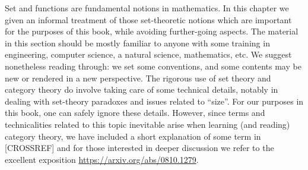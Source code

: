 


Set and functions are fundamental notions in mathematics. In this chapter we given an informal treatment of those set-theoretic notions which are important for the purposes of this book, while avoiding further-going aspects. The material in this section should be mostly familiar to anyone with some training in engineering, computer science, a natural science, mathematics, etc. We suggest nonetheless reading through: we set some conventions, and some contents may be new or rendered in a new perspective. The rigorous use of set theory and category theory do involve taking care of some technical details, notably in dealing with set-theory paradoxes and issues related to ``size''. For our purposes in this book, one can safely ignore these details. However, since terms and technicalities related to this topic inevitable arise when learning (and reading) category theory, we have included a short explanation of some term in [CROSSREF] and for those interested in deeper discussion we refer to the excellent exposition \url{https://arxiv.org/abs/0810.1279}.


\label{ch:sets}
\clearpage









